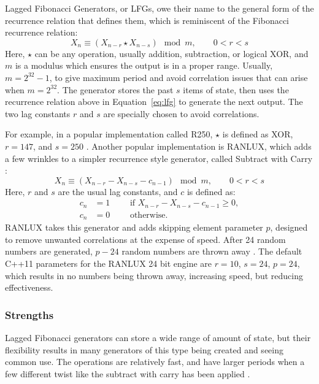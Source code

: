Lagged Fibonacci Generators, or LFGs, owe their name to the general form of the recurrence relation that defines them, which is reminiscent of the Fibonacci recurrence relation:
\begin{equation} \label{eq:lfg}
    X_{n} \equiv \left(X_{n-r} \star X_{n-s}\right) \mod m, \qquad 0 < r < s
\end{equation}
Here, $\star$ can be any operation, usually addition, subtraction, or logical XOR, and $m$ is a modulus which ensures the output is in a proper range. Usually, $m=2^{32} - 1$, to give maximum period and avoid correlation issues that can arise when $m=2^32$. The generator stores the past $s$ items of state, then uses the recurrence relation above in Equation~\ref{eq:lfg} to generate the next output. The two lag constants $r$ and $s$ are specially chosen to avoid correlations.

For example, in a popular implementation called R250, $\star$ is defined as XOR, $r=147$, and $s=250$ \cite{kirkpatrick1981very}. Another popular implementation is RANLUX, which adds a few wrinkles to a simpler recurrence style generator, called Subtract with Carry \cite{marsaglia1991new,marsaglia2003random}:
\begin{equation} \label{eqn:swc}
    X_{n} \equiv \left(X_{n-r} - X_{n-s} - c_{n-1}\right) \mod m, \qquad 0 < r < s
\end{equation}
Here, $r$ and $s$ are the usual lag constants, and $c$ is defined as:
\begin{align*}
    c_n &= 1 \qquad \text{ if } X_{n-r} - X_{n-s} - c_{n-1} \geq 0, \\
    c_n &= 0 \qquad \text{ otherwise.}
\end{align*}
RANLUX takes this generator and adds skipping element parameter $p$, designed to remove unwanted correlations at the expense of speed. After 24 random numbers are generated, $p-24$ random numbers are thrown away \cite{luscher1994portable,james1994ranlux}. The default C++11 parameters for the RANLUX 24 bit engine are $r = 10$, $s = 24$, $p=24$, which results in no numbers being thrown away, increasing speed, but reducing effectiveness.

\subsubsection{Strengths}
Lagged Fibonacci generators can store a wide range of amount of state, but their flexibility results in many generators of this type being created and seeing common use. The operations are relatively fast, and have larger periods when a few different twist like the subtract with carry has been applied \cite{marsaglia2003random}.


